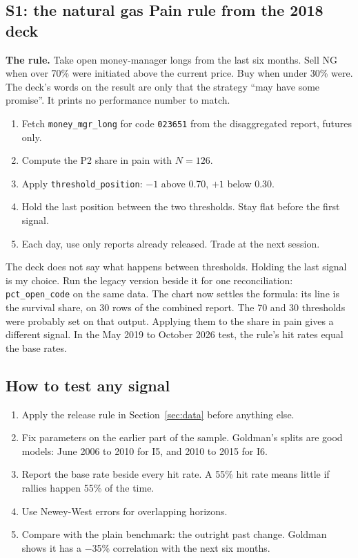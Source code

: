 \documentclass[11pt,a4paper]{article}
\newcommand{\code}[1]{\nolinkurl{#1}}
\begin{document}
\subsection{S1: the natural gas Pain rule from the 2018 deck}

\textbf{The rule.} Take open money-manager longs from the last six months. Sell NG when over 70\% were initiated above the current price. Buy when under 30\% were. The deck's words on the result are only that the strategy ``may have some promise''. It prints no performance number to match.

\begin{enumerate}
\item Fetch \code{money_mgr_long} for code \code{023651} from the disaggregated report, futures only.
\item Compute the P2 share in pain with $N = 126$.
\item Apply \code{threshold_position}: $-1$ above 0.70, $+1$ below 0.30.
\item Hold the last position between the two thresholds. Stay flat before the first signal.
\item Each day, use only reports already released. Trade at the next session.
\end{enumerate}

\begin{decision}
The deck does not say what happens between thresholds. Holding the last signal is my choice. Run the legacy version beside it for one reconciliation: \code{pct_open_code} on the same data. The chart now settles the formula: its line is the survival share, on 30 rows of the combined report. The 70 and 30 thresholds were probably set on that output. Applying them to the share in pain gives a different signal. In the May 2019 to October 2026 test, the rule's hit rates equal the base rates.
\end{decision}

\subsection{How to test any signal}

\begin{enumerate}
\item Apply the release rule in Section~\ref{sec:data} before anything else.
\item Fix parameters on the earlier part of the sample. Goldman's splits are good models: June 2006 to 2010 for I5, and 2010 to 2015 for I6.
\item Report the base rate beside every hit rate. A 55\% hit rate means little if rallies happen 55\% of the time.
\item Use Newey-West errors for overlapping horizons.
\item Compare with the plain benchmark: the outright past change. Goldman shows it has a $-$35\% correlation with the next six months.
\end{enumerate}
\end{document}
